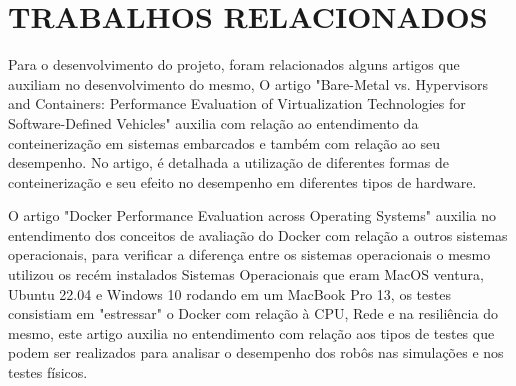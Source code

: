 \chapter{TRABALHOS RELACIONADOS} \label{trabs}
\begin{comment}
\emph{Questão a ser respondida pelos Trabalhos relacionados: O que os outros já fizeram?}
Seção em que serão descritos os trabalhos do estado da arte sobre o tema escolhido. Essa seção deve ser feita com base nos artigos mais novos e mais relevantes da área, seguindo o procedimento detalhado em Revisão Bibliográfica. Nessa seção todos os parágrafos devem também ter citação.

Exemplos de citação: 

Citação online (\verb!\citeonline{citacao_do_arquivo_bib}!): segundo \citeonline{dperico2021}, dado um grupo de agentes autônomos egocêntricos que percebem o ambiente por meio de câmeras independentes, o desenvolvimento de algoritmos capazes de produzir um conjunto de comandos de alto nível (envolvendo direções qualitativas: por exemplo, mover para a esquerda, seguir em frente) capaz de guiar um robô privado de sentido para um local de destino é possível. Citação tradicional (\verb!\cite{citacao_do_arquivo_bib}!): \cite{dperico2021}.

Mais detalhes sobre a seção Trabalhos Relacionados:
\url{https://encurtador.com.br/ozNY9}
\end{comment}
Para o desenvolvimento do projeto, foram relacionados alguns artigos que auxiliam no desenvolvimento do mesmo, O artigo "Bare-Metal vs. Hypervisors and Containers: Performance Evaluation of Virtualization Technologies for Software-Defined Vehicles"\cite{Wen2023} auxilia com relação ao entendimento da conteinerização em sistemas embarcados e também com relação ao seu desempenho. No artigo, é detalhada a utilização de diferentes formas de conteinerização e seu efeito no desempenho em diferentes tipos de hardware.

O artigo "Docker Performance Evaluation across Operating Systems"\cite{SMKD2024} auxilia no entendimento dos conceitos de avaliação do Docker com relação a outros sistemas operacionais, para verificar a diferença entre os sistemas operacionais o mesmo utilizou os recém instalados Sistemas Operacionais que eram MacOS ventura, Ubuntu 22.04 e Windows 10 rodando em um MacBook Pro 13, os testes consistiam em "estressar" o Docker com relação à CPU, Rede e na resiliência do mesmo, este artigo auxilia no entendimento com relação aos tipos de testes que podem ser realizados para analisar o desempenho dos robôs nas simulações e nos testes físicos.


